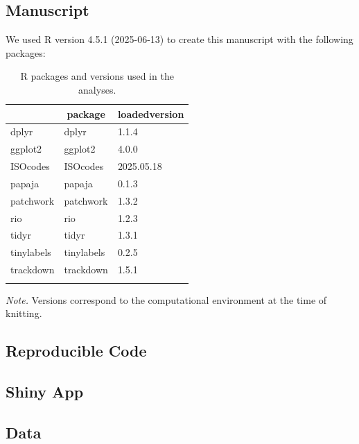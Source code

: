\documentclass[
  english,
  man,floatsintext]{apa6}
\begin{document}
\subsection{Manuscript}\label{manuscript}

We used R version 4.5.1 (2025-06-13) to create this manuscript with the following packages:

\begin{table}[H]

\begin{center}
\begin{threeparttable}

\caption{\label{tab:unnamed-chunk-11}R packages and versions used in the analyses.}

\begin{tabular}{lll}
\toprule
 & \multicolumn{1}{c}{package} & \multicolumn{1}{c}{loadedversion}\\
\midrule
dplyr & dplyr & 1.1.4\\
ggplot2 & ggplot2 & 4.0.0\\
ISOcodes & ISOcodes & 2025.05.18\\
papaja & papaja & 0.1.3\\
patchwork & patchwork & 1.3.2\\
rio & rio & 1.2.3\\
tidyr & tidyr & 1.3.1\\
tinylabels & tinylabels & 0.2.5\\
trackdown & trackdown & 1.5.1\\
\bottomrule
\addlinespace
\end{tabular}

\begin{tablenotes}[para]
\normalsize{\textit{Note.} Versions correspond to the computational environment at the time of knitting.}
\end{tablenotes}

\end{threeparttable}
\end{center}

\end{table}

\subsection{Reproducible Code}\label{reproducible-code}

\subsection{Shiny App}\label{shiny-app}

\subsection{Data}\label{data}
\end{document}
